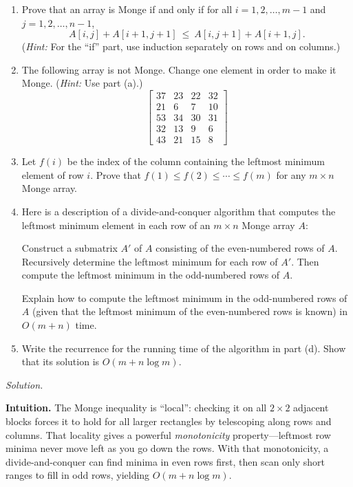 \documentclass[12pt]{article}
\theoremstyle{definition}
\begin{document}
\begin{enumerate}
\item Prove that an array is Monge if and only if for all $i=1,2,\ldots,m-1$ and $j=1,2,\ldots,n-1$,
\[
A[i,j]+A[i+1,j+1]\ \le\ A[i,j+1]+A[i+1,j].
\]
(\emph{Hint:} For the “if” part, use induction separately on rows and on columns.)

\item The following array is not Monge. Change one element in order to make it Monge.
(\emph{Hint:} Use part (a).)
\[
\begin{bmatrix}
37&23&22&32\\
21&6&7&10\\
53&34&30&31\\
32&13&9&6\\
43&21&15&8
\end{bmatrix}
\]

\item Let $f(i)$ be the index of the column containing the leftmost minimum element of row $i$.
Prove that $f(1)\le f(2)\le\cdots\le f(m)$ for any $m\times n$ Monge array.

\item Here is a description of a divide-and-conquer algorithm that computes the leftmost minimum
element in each row of an $m\times n$ Monge array $A$:

\smallskip
Construct a submatrix $A'$ of $A$ consisting of the even-numbered rows of $A$.
Recursively determine the leftmost minimum for each row of $A'$. Then compute the leftmost
minimum in the odd-numbered rows of $A$.

Explain how to compute the leftmost minimum in the odd-numbered rows of $A$ (given that the
leftmost minimum of the even-numbered rows is known) in $O(m+n)$ time.

\item Write the recurrence for the running time of the algorithm in part (d).
Show that its solution is $O(m+n\log m)$.
\end{enumerate}

\medskip
\noindent\textit{Solution.}

\medskip
\noindent\textbf{Intuition.}
The Monge inequality is “local”: checking it on all $2\times2$ adjacent blocks forces it to hold for
all larger rectangles by telescoping along rows and columns. That locality gives a powerful
\emph{monotonicity} property—leftmost row minima never move left as you go down the rows.
With that monotonicity, a divide-and-conquer can find minima in even rows first, then scan only
short ranges to fill in odd rows, yielding $O(m+n\log m)$.
\end{document}
